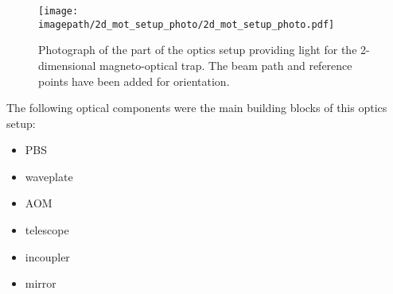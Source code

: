 \begin{figure}
    \centering
    \texttt{[image: \\imagepath/2d\_mot\_setup\_photo/2d\_mot\_setup\_photo.pdf]}
    \caption{Photograph of the part of the optics setup providing light for the 2-dimensional magneto-optical trap. The beam path and reference points have been added for orientation.}\label{fig:2d_mot_setup_photo}
\end{figure}

The following optical components were the main building blocks of this optics setup: 
\begin{itemize}
    \item PBS
    \item waveplate
    \item AOM
    \item telescope
    \item incoupler
    \item mirror
\end{itemize}

